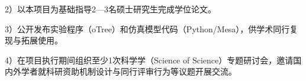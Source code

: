2）以本项目为基础指导2—3名硕士研究生完成学位论文。

3）公开发布实验程序（oTree）和仿真模型代码（Python/Mesa），供学术同行复现与拓展使用。

4）在项目执行期间组织至少1次科学学（Science of Science）专题研讨会，邀请国内外学者就科研资助机制设计与同行评审行为等议题开展交流。




